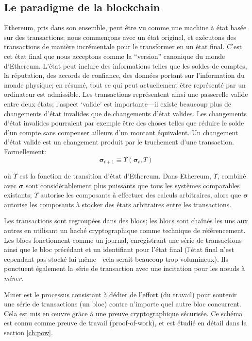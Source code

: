 \documentclass[9pt,oneside]{amsart}
\begin{document}
\begin{multicols}{2}
\section{Le paradigme de la blockchain} \label{ch:overview}

Ethereum, pris dans son ensemble, peut être vu comme une machine à état basée sur des transactions: nous commençons avec un état originel, et exécutons des transactions de manière incrémentale pour le transformer en un état final. C'est cet état final que nous acceptons comme la ``version'' canonique du monde d'Ethereum. L'état peut inclure des informations telles que les soldes de comptes, la réputation, des accords de confiance, des données portant sur l'information du monde physique; en résumé, tout ce qui peut actuellement être représenté par un ordinateur est admissible. Les transactions représentent ainsi une passerelle valide entre deux états; l’aspect `valide' est importante---il existe beaucoup plus de changements d'état invalides que de changements d'état valides. Les changements d'état invalides pourraient par exemple être des choses telles que réduire le solde d'un compte sans compenser ailleurs d'un montant équivalent. Un changement d'état valide est un changement produit par le truchement d’une transaction. Formellement: 
\begin{equation}
\boldsymbol{\sigma}_{t+1} \equiv \Upsilon(\boldsymbol{\sigma}_t, T)
\end{equation}


où $\Upsilon$ est la fonction de transition d'état d’Ethereum. Dans Ethereum, $\Upsilon$, combiné avec $\boldsymbol{\sigma}$ sont considérablement plus puissants que tous les systèmes comparables existants; $\Upsilon$ autorise les composants à effectuer des calculs arbitraires, alors que $\boldsymbol{\sigma}$ autorise les composants à stocker des états arbitraires entre les transactions.

Les transactions sont regroupées dans des blocs; les blocs sont chaînés les uns aux autres en utilisant un haché cryptographique comme technique de référencement. Les blocs fonctionnent comme un journal, enregistrant une série de transactions ainsi que le bloc précédant et un identifiant pour l'état final (l'état final n'est cependant pas stocké lui-même---cela serait beaucoup trop volumineux). Ils ponctuent également la série de transaction avec une incitation pour les n\oe{}uds à \textit{miner}.

Miner est le processus consistant à dédier de l'effort (du travail) pour soutenir une série de transactions (un bloc) contre n'importe quel autre bloc concurrent. Cela est mis en \oe{}uvre grâce à une preuve cryptographique sécurisée. Ce schéma est connu comme preuve de travail (proof-of-work), et est étudié en détail dans la section \ref{ch:pow}.



\end{multicols}
\end{document}
